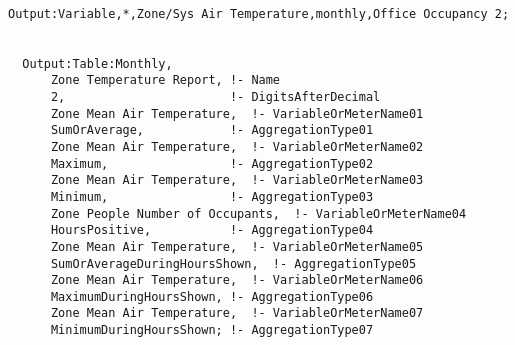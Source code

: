 \begin{lstlisting}

Output:Variable,*,Zone/Sys Air Temperature,monthly,Office Occupancy 2;


  Output:Table:Monthly,
      Zone Temperature Report, !- Name
      2,                       !- DigitsAfterDecimal
      Zone Mean Air Temperature,  !- VariableOrMeterName01
      SumOrAverage,            !- AggregationType01
      Zone Mean Air Temperature,  !- VariableOrMeterName02
      Maximum,                 !- AggregationType02
      Zone Mean Air Temperature,  !- VariableOrMeterName03
      Minimum,                 !- AggregationType03
      Zone People Number of Occupants,  !- VariableOrMeterName04
      HoursPositive,           !- AggregationType04
      Zone Mean Air Temperature,  !- VariableOrMeterName05
      SumOrAverageDuringHoursShown,  !- AggregationType05
      Zone Mean Air Temperature,  !- VariableOrMeterName06
      MaximumDuringHoursShown, !- AggregationType06
      Zone Mean Air Temperature,  !- VariableOrMeterName07
      MinimumDuringHoursShown; !- AggregationType07
\end{lstlisting}
